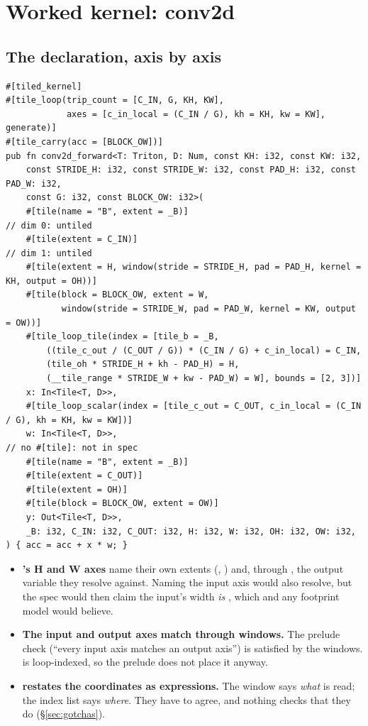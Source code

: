 \section{Worked kernel: conv2d}
\label{sec:conv2d}

\subsection{The declaration, axis by axis}

\begin{lstlisting}
#[tiled_kernel]
#[tile_loop(trip_count = [C_IN, G, KH, KW],
            axes = [c_in_local = (C_IN / G), kh = KH, kw = KW], generate)]
#[tile_carry(acc = [BLOCK_OW])]
pub fn conv2d_forward<T: Triton, D: Num, const KH: i32, const KW: i32,
    const STRIDE_H: i32, const STRIDE_W: i32, const PAD_H: i32, const PAD_W: i32,
    const G: i32, const BLOCK_OW: i32>(
    #[tile(name = "B", extent = _B)]                                     // dim 0: untiled
    #[tile(extent = C_IN)]                                               // dim 1: untiled
    #[tile(extent = H, window(stride = STRIDE_H, pad = PAD_H, kernel = KH, output = OH))]
    #[tile(block = BLOCK_OW, extent = W,
           window(stride = STRIDE_W, pad = PAD_W, kernel = KW, output = OW))]
    #[tile_loop_tile(index = [tile_b = _B,
        ((tile_c_out / (C_OUT / G)) * (C_IN / G) + c_in_local) = C_IN,
        (tile_oh * STRIDE_H + kh - PAD_H) = H,
        (__tile_range * STRIDE_W + kw - PAD_W) = W], bounds = [2, 3])]
    x: In<Tile<T, D>>,
    #[tile_loop_scalar(index = [tile_c_out = C_OUT, c_in_local = (C_IN / G), kh = KH, kw = KW])]
    w: In<Tile<T, D>>,                                                   // no #[tile]: not in spec
    #[tile(name = "B", extent = _B)]
    #[tile(extent = C_OUT)]
    #[tile(extent = OH)]
    #[tile(block = BLOCK_OW, extent = OW)]
    y: Out<Tile<T, D>>,
    _B: i32, C_IN: i32, C_OUT: i32, H: i32, W: i32, OH: i32, OW: i32,
) { acc = acc + x * w; }
\end{lstlisting}

\begin{itemize}
\item \textbf{'s H and W axes} name their own extents (, ) and,
  through , the output variable they resolve against. Naming the
  input axis  would also resolve, but the spec would then claim the input's
  width \emph{is} , which  and any footprint model would
  believe.
\item \textbf{The input and output axes match through windows.} The prelude check
  (``every input axis matches an output axis'') is satisfied by the windows. 
  is loop-indexed, so the prelude does not place it anyway.
\item \textbf{ restates the coordinates as expressions.} The
  window says \emph{what} is read; the index list says \emph{where}. They have to
  agree, and nothing checks that they do (\S\ref{sec:gotchas}).
\end{itemize}

